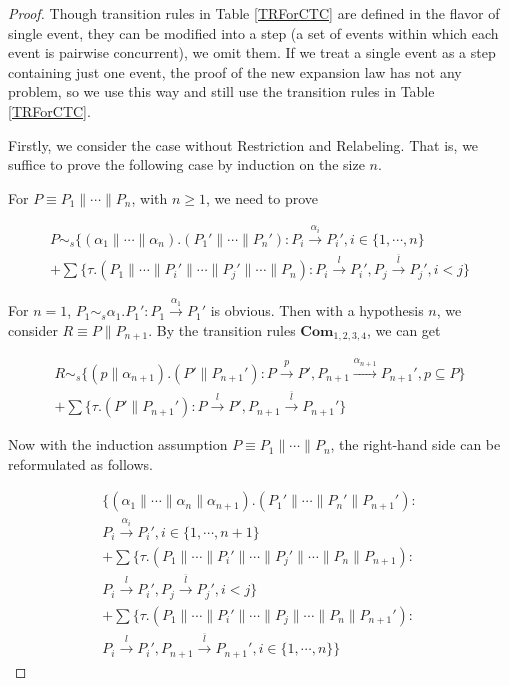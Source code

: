 \begin{proof}
Though transition rules in Table \ref{TRForCTC} are defined in the flavor of single event, they can be modified into a step (a set of events within which each event is pairwise concurrent), we omit them. If we treat a single event as a step containing just one event, the proof of the new expansion law has not any problem, so we use this way and still use the transition rules in Table \ref{TRForCTC}.

Firstly, we consider the case without Restriction and Relabeling. That is, we suffice to prove the following case by induction on the size $n$.

For $P\equiv P_1\parallel\cdots\parallel P_n$, with $n\geq 1$, we need to prove


\begin{eqnarray}
P\sim_s \{(\alpha_1\parallel\cdots\parallel \alpha_n).(P_1'\parallel\cdots\parallel P_n'): P_i\xrightarrow{\alpha_i}P_i',i\in\{1,\cdots,n\}\nonumber\\
+\sum\{\tau.(P_1\parallel\cdots\parallel P_i'\parallel\cdots\parallel P_j'\parallel\cdots\parallel P_n): P_i\xrightarrow{l}P_i',P_j\xrightarrow{\overline{l}}P_j',i<j\} \nonumber
\end{eqnarray}

For $n=1$, $P_1\sim_s \alpha_1.P_1':P_1\xrightarrow{\alpha_1}P_1'$ is obvious. Then with a hypothesis $n$, we consider $R\equiv P\parallel P_{n+1}$. By the transition rules $\textbf{Com}_{1,2,3,4}$, we can get

\begin{eqnarray}
R\sim_s \{(p\parallel \alpha_{n+1}).(P'\parallel P_{n+1}'): P\xrightarrow{p}P',P_{n+1}\xrightarrow{\alpha_{n+1}}P_{n+1}',p\subseteq P\}\nonumber\\
+\sum\{\tau.(P'\parallel P_{n+1}'): P\xrightarrow{l}P',P_{n+1}\xrightarrow{\overline{l}}P_{n+1}'\} \nonumber
\end{eqnarray}

Now with the induction assumption $P\equiv P_1\parallel\cdots\parallel P_n$, the right-hand side can be reformulated as follows.

\begin{eqnarray}
\{(\alpha_1\parallel\cdots\parallel \alpha_n\parallel \alpha_{n+1}).(P_1'\parallel\cdots\parallel P_n'\parallel P_{n+1}'): \nonumber\\
P_i\xrightarrow{\alpha_i}P_i',i\in\{1,\cdots,n+1\}\nonumber\\
+\sum\{\tau.(P_1\parallel\cdots\parallel P_i'\parallel\cdots\parallel P_j'\parallel\cdots\parallel P_n\parallel P_{n+1}): \nonumber\\
P_i\xrightarrow{l}P_i',P_j\xrightarrow{\overline{l}}P_j',i<j\} \nonumber\\
+\sum\{\tau.(P_1\parallel\cdots\parallel P_i'\parallel\cdots\parallel P_j\parallel\cdots\parallel P_n\parallel P_{n+1}'): \nonumber\\
P_i\xrightarrow{l}P_i',P_{n+1}\xrightarrow{\overline{l}}P_{n+1}',i\in\{1,\cdots, n\}\} \nonumber
\end{eqnarray}


\end{proof}
